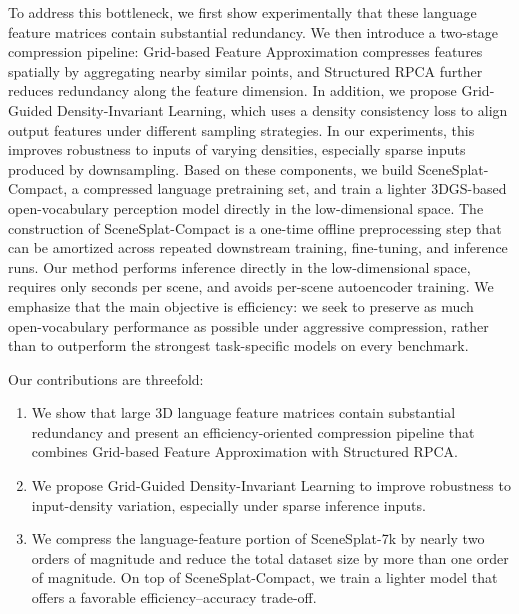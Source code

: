 \documentclass[10pt,twocolumn,letterpaper]{article}
\begin{document}
To address this bottleneck, we first show experimentally that these language feature matrices contain substantial redundancy. We then introduce a two-stage compression pipeline: Grid-based Feature Approximation compresses features spatially by aggregating nearby similar points, and Structured RPCA further reduces redundancy along the feature dimension.
In addition, we propose Grid-Guided Density-Invariant Learning, which uses a density consistency loss to align output features under different sampling strategies. In our experiments, this improves robustness to inputs of varying densities, especially sparse inputs produced by downsampling.
Based on these components, we build SceneSplat-Compact, a compressed language pretraining set, and train a lighter 3DGS-based open-vocabulary perception model directly in the low-dimensional space. The construction of SceneSplat-Compact is a one-time offline preprocessing step that can be amortized across repeated downstream training, fine-tuning, and inference runs. Our method performs inference directly in the low-dimensional space, requires only seconds per scene, and avoids per-scene autoencoder training. We emphasize that the main objective is efficiency: we seek to preserve as much open-vocabulary performance as possible under aggressive compression, rather than to outperform the strongest task-specific models on every benchmark.

Our contributions are threefold:
\begin{enumerate}
    \item We show that large 3D language feature matrices contain substantial redundancy and present an efficiency-oriented compression pipeline that combines Grid-based Feature Approximation with Structured RPCA.
    \item We propose Grid-Guided Density-Invariant Learning to improve robustness to input-density variation, especially under sparse inference inputs.
    \item We compress the language-feature portion of SceneSplat-7k by nearly two orders of magnitude and reduce the total dataset size by more than one order of magnitude. On top of SceneSplat-Compact, we train a lighter model that offers a favorable efficiency--accuracy trade-off.
\end{enumerate}
\end{document}
